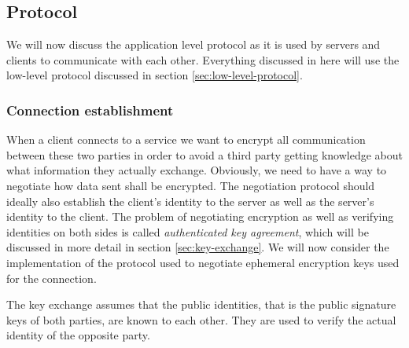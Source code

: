 \subsection{Protocol}
\label{sec:protocol}

We will now discuss the application level protocol as it is used by servers and clients to communicate with each other.
Everything discussed in here will use the low-level protocol discussed in section \ref{sec:low-level-protocol}.

\subsubsection{Connection establishment}
\label{sec:connection-establishment}

When a client connects to a service we want to encrypt all communication between these two parties in order to avoid a third party getting knowledge about what information they actually exchange.
Obviously, we need to have a way to negotiate how data sent shall be encrypted.
The negotiation protocol should ideally also establish the client's identity to the server as well as the server's identity to the client.
The problem of negotiating encryption as well as verifying identities on both sides is called \emph{authenticated key agreement}, which will be discussed in more detail in section \ref{sec:key-exchange}.
We will now consider the implementation of the protocol used to negotiate ephemeral encryption keys used for the connection.

The key exchange assumes that the public identities, that is the public signature keys of both parties, are known to each other.
They are used to verify the actual identity of the opposite party.

